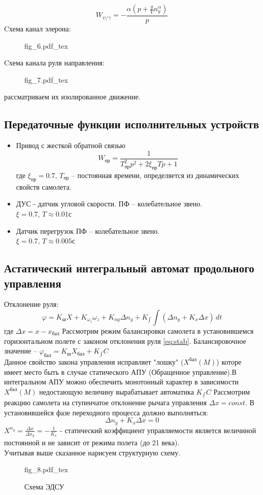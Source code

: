 \documentclass{article}
\begin{document}
\[
W_{\psi/\gamma} = -\frac{\alpha(p + \frac{g}{V} n_y^\alpha)} {p}
\]
Cхема канал элерона:
\begin{figure}[h]
{fig_6.pdf_tex}
\end{figure}
Cхема канала руля направления:
\begin{figure}[h]
{fig_7.pdf_tex}
\end{figure}
рассматриваем их изолированное движение.

\subsection{Передаточные функции исполнительных устройств}
\begin{itemize}
\item Привод с жесткой обратной связью
\[
W_{пр} = \frac{1}{T_{пр}^2p^2 + 2 \xi_{пр} Tp + 1}
\]
где $\xi_{пр} = 0.7$, $T_{пр}$ -- постоянная времени, определяется из динамических свойств самолета.

\item ДУС - датчик угловой скорости.
ПФ -- колебательное звено.\\
$\xi = 0.7$, $T \approx 0.01 с$

\item Датчик перегрузок 
ПФ -- колебательное звено.\\
$\xi = 0.7$, $T \approx 0.005 с$
\end{itemize}

\subsection{Астатический интегральный автомат продольного управления}
Отклонение руля:
\begin{equation}
\varphi = K_ш X + K_{\omega_z} \omega_z + K_{ny} \Delta n_y + K_{\int} \int (\Delta n_y + K_x \Delta x) \, dt
\label{eq:stab}
\end{equation}
где $\Delta x = x - x_{бал}$
Рассмотрим режим балансировки самолета в установившемся горизонтальном полете с законом отклонения руля \eqref{eq:stab}.
Балансировочное значение -- $\varphi_{бал} = K_ш X_{бал} + K_{\int} C$\\
Данное свойство закона управления исправляет "лошку" ($X^{бал}(M)$) которе имеет место быть в случае статического АПУ (Обращенное управление).В интегральном АПУ можно обеспечить монотонный характер в зависимости $X^{бал} (M)$ недостающую величину вырабатывает автоматика $K_{\int}C$
Рассмотрим реакцию самолета на ступенчатое отклонение рычага управления $\Delta x = const$. В установившейся фазе переходного процесса должно выполняться:
\[
\Delta n_y + K_x \Delta x = 0
\]
$ X^{n_y} = \frac{\Delta x}{\Delta n_y} = -\frac{1}{K_x} $ - статический коэффициент управляемости является величиной постоянной и не зависит от режима полета (до 21 века). \\
Учитывая выше сказанное нарисуем структурную схему.\\ 
\begin{figure}[H]
\begin{minipage}{\textwidth}
{fig_8.pdf_tex}
\end{minipage}
\caption{Схема ЭДСУ}
\end{figure}
\end{document}
